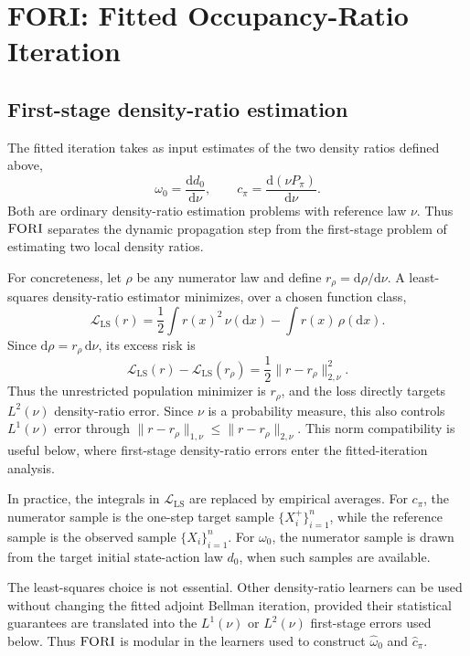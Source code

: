 \documentclass{article}
\newcommand{\1}{\mathbf{1}}
\newcommand{\dd}{\mathrm{d}}
\newcommand{\cpi}{c_\pi}
\newcommand{\omegazero}{\omega_0}
\newcommand{\omegahatzero}{\widehat{\omega}_0}
\newcommand{\Ppi}{P_\pi}
\newcommand{\dinit}{d_0}
\newcommand{\chat}{\widehat{c}_\pi}
\theoremstyle{plain}
\theoremstyle{definition}
\theoremstyle{remark}
\begin{document}
\section{\textsc{FORI}: Fitted Occupancy-Ratio Iteration}
\label{sec:algorithm}

\subsection{First-stage density-ratio estimation}
\label{sec:first-stage-ratios}

The fitted iteration takes as input estimates of the two density ratios defined
above,
\[
    \omegazero=\frac{\dd\dinit}{\dd\nu},
    \qquad
    \cpi=\frac{\dd(\nu\Ppi)}{\dd\nu}.
\]
Both are ordinary density-ratio estimation problems with reference law \(\nu\).
Thus \(\textsc{FORI}\) separates the dynamic propagation step from the
first-stage problem of estimating two local density ratios.

For concreteness, let \(\rho\) be any numerator law and define
\(r_\rho=\dd\rho/\dd\nu\). A least-squares density-ratio estimator minimizes,
over a chosen function class,
\[
    \mathcal L_{\mathrm{LS}}(r)
    =
    \frac12 \int r(x)^2\,\nu(\dd x)
    -
    \int r(x)\,\rho(\dd x).
\]
Since \(\dd\rho=r_\rho\,\dd\nu\), its excess risk is
\[
    \mathcal L_{\mathrm{LS}}(r)-\mathcal L_{\mathrm{LS}}(r_\rho)
    =
    \frac12 \|r-r_\rho\|_{2,\nu}^2 .
\]
Thus the unrestricted population minimizer is \(r_\rho\), and the loss directly
targets \(L^2(\nu)\) density-ratio error. Since \(\nu\) is a probability
measure, this also controls \(L^1(\nu)\) error through
\(\|r-r_\rho\|_{1,\nu}\le \|r-r_\rho\|_{2,\nu}\). This norm compatibility is
useful below, where first-stage density-ratio errors enter the fitted-iteration
analysis.

In practice, the integrals in \(\mathcal L_{\mathrm{LS}}\) are replaced by
empirical averages. For \(\cpi\), the numerator sample is the one-step target
sample \(\{X_i^+\}_{i=1}^n\), while the reference sample is the observed sample
\(\{X_i\}_{i=1}^n\). For \(\omegazero\), the numerator sample is drawn from the
target initial state-action law \(\dinit\), when such samples are available.

The least-squares choice is not essential. Other density-ratio learners can be
used without changing the fitted adjoint Bellman iteration, provided their
statistical guarantees are translated into the \(L^1(\nu)\) or \(L^2(\nu)\)
first-stage errors used below. Thus \(\textsc{FORI}\) is modular in the
learners used to construct \(\omegahatzero\) and \(\chat\).
\end{document}
